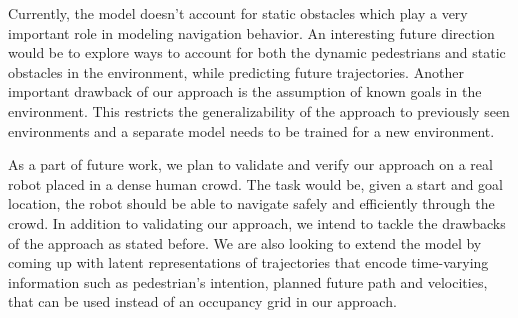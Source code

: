 Currently, the model doesn't account for static obstacles which play a
very important role in modeling navigation behavior. An interesting
future direction would be to explore ways to account for both the
dynamic pedestrians and static obstacles in the environment, while
predicting future trajectories. Another important drawback of our
approach is the assumption of known goals in the environment. This
restricts the generalizability of the approach to previously seen
environments and a separate model needs to be trained for a new
environment.


As a part of future work, we plan to validate and verify our approach
on a real robot placed in a dense human crowd. The task would be,
given a start and goal location, the robot should be able to navigate
safely and efficiently through the crowd. In addition to validating
our approach, we intend to tackle the drawbacks of the approach as
stated before. We are also looking to extend the model by coming up
with latent representations of trajectories that encode time-varying
information such as pedestrian's intention, planned future path and
velocities, that can be used instead of an occupancy grid in our
approach.


